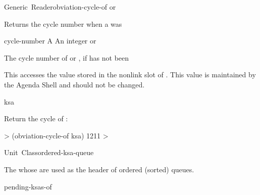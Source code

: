 \documentclass[10pt,twoside,english,pdftex]{article}
\begin{document}
\begin{functiondoc}{Generic~Reader}{obviation-cycle-of}{ 
    \returns{}  or \nil}
%

\fnsyntax

\fnpurpose Returns the cycle number when a  was 

\fnmethods
{}

\fnpackage {}

\fnmodule {}

\fnargs
\begin{args}{cycle-number}
\arg[ksa] A 
 An integer or \nil{}
\end{args}

\fnreturns The  cycle number of  or \nil,
if  has not been 
  
\fndescription 
This  accesses the value stored in the 
 nonlink slot of .  This value is
maintained by the Agenda Shell and should not be changed.

\begin{alsos}{ksa}
\also[ksa]
\end{alsos}

\fnexample
Return the  cycle of :
%
\W\supp
\begin{example}
  > (obviation-cycle-of ksa)
  1211
  >
\end{example}

\end{functiondoc}


\begin{functiondoc}{Unit~Class}{ordered-ksa-queue}{}
%
%

\fnsyntax

\fnpackage {}

\fnmodule {}

\fndescription The  whose  are used as
the header of ordered (sorted)  queues.

\begin{alsos}{pending-ksas-of}
\also[ksa]
\also[on-queue-p]
\also[queue]
\end{alsos}

\end{functiondoc}
\end{document}

